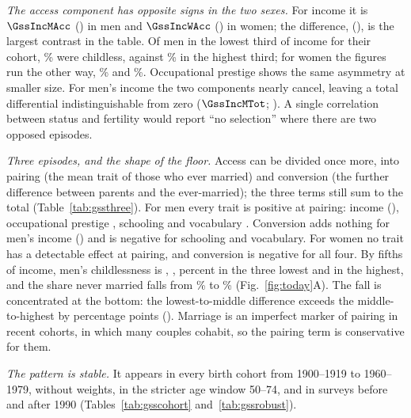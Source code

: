 \emph{The access component has opposite signs in the two sexes.} For income it is $\GssIncMAcc$ (\GssIncMAccCI) in men and
$\GssIncWAcc$ (\GssIncWAccCI) in women; the difference, \GssIncDiffAcc{} (\GssIncDiffAccCI), is the largest contrast in the
table. Of men in the lowest third of income for their cohort, \GssChlMIncLo\% were childless, against \GssChlMIncHi\% in the
highest third; for women the figures run the other way, \GssChlWIncLo\% and \GssChlWIncHi\%. Occupational
prestige shows the same asymmetry at smaller size. For men's income the two components nearly cancel, leaving a total
differential indistinguishable from zero ($\GssIncMTot$; \GssIncMTotCI). A single correlation between status and fertility
would report ``no selection'' where there are two opposed episodes.

\emph{Three episodes, and the shape of the floor.} Access can be divided once more, into pairing (the mean trait of those who
ever married) and conversion (the further difference between parents and the ever-married); the three terms still sum to the
total (Table~\ref{tab:gssthree}). For men every trait is positive at pairing: income \GssIncMPair{} (\GssIncMPairCI), occupational
prestige \GssPreMPair, schooling \GssSchMPair{} and vocabulary \GssVocMPair. Conversion adds nothing for men's income
(\GssIncMConv) and is negative for schooling and vocabulary. For women no trait has a detectable effect at pairing, and
conversion is negative for all four. By fifths of income, men's childlessness is \GssQfMOne, \GssQfMTwo, \GssQfMThree{} percent in
the three lowest and \GssQfMFive{} in the highest, and the share never married falls from \GssNmMOne\% to \GssNmMFive\%
(Fig.~\ref{fig:today}A). The fall is concentrated at the bottom: the lowest-to-middle difference exceeds the middle-to-highest by
\GssFloorM{} percentage points (\GssFloorMCI). Marriage is an imperfect marker of pairing in recent cohorts, in which many
couples cohabit, so the pairing term is conservative for them.

\emph{The pattern is stable.} It appears in every birth cohort from 1900--1919 to 1960--1979, without weights, in the stricter
age window 50--74, and in surveys before and after 1990 (Tables~\ref{tab:gsscohort} and~\ref{tab:gssrobust}).

